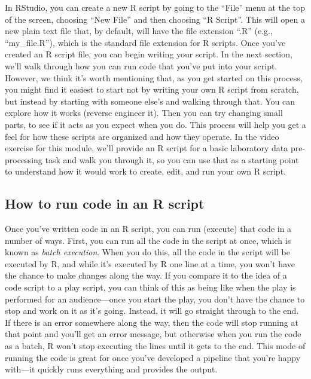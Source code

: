 \documentclass[]{tufte-book}
\begin{document}
In RStudio, you can create a new R script by going to the ``File'' menu at the top
of the screen, choosing ``New File'' and then choosing ``R Script''. This will open
a new plain text file that, by default, will have the file extension ``.R'' (e.g.,
``my\_file.R''), which is the standard file extension for R scripts. Once you've
created an R script file, you can begin writing your script. In the next
section, we'll walk through how you can run code that you've put into your
script. However, we think it's worth mentioning that, as you get started on this
process, you might find it easiest to start not by writing your own R script
from scratch, but instead by starting with someone else's and walking through
that. You can explore how it works (reverse engineer it). Then you can try
changing small parts, to see if it acts as you expect when you do. This process
will help you get a feel for how these scripts are organized and how they
operate. In the video exercise for this module, we'll provide an R script for a
basic laboratory data pre-processing task and walk you through it, so you can use
that as a starting point to understand how it would work to create, edit, and
run your own R script.

\subsection{How to run code in an R script}\label{how-to-run-code-in-an-r-script}

Once you've written code in an R script, you can run (execute) that code in a
number of ways. First, you can run all the code in the script at once, which is
known as \emph{batch execution}. When you do this, all the code in the script will be
executed by R, and while it's executed by R one line at a time, you won't have
the chance to make changes along the way. If you compare it to the idea of a
code script to a play script, you can think of this as being like when the
play is performed for an audience---once you start the play, you don't have
the chance to stop and work on it as it's going. Instead, it will go straight
through to the end. If there is an error somewhere along the way, then the code
will stop running at that point and you'll get an error message, but otherwise
when you run the code as a batch, R won't stop executing the lines until it gets
to the end. This mode of running the code is great for once you've developed a
pipeline that you're happy with---it quickly runs everything and provides the
output.
\end{document}
